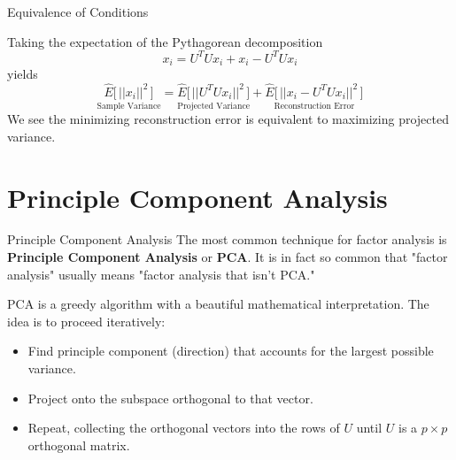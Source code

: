 \documentclass[10pt, table, dvipsnames,xcdraw,handout]{beamer}
\def\layersep{2.5cm}
\begin{document}
\begin{frame}[fragile]{Equivalence of Conditions}
\begin{minipage}[t][0.4\textheight][t]{\textwidth}\centering
{}
  \end{minipage}
  \vfill
\begin{minipage}[t][0.4\textheight][t]{\textwidth}
Taking the expectation of the Pythagorean decomposition 
$$
x_i = U^TUx_i + x_i - U^TUx_i
$$
yields
$$
\underset{\text{Sample Variance}}{\widehat{E}\big[\,|| x_i ||^2\,\big]} 
= 
\underset{\text{Projected Variance}}{\widehat{E}\big[\,|| U^TUx_i  ||^2\,\big]}
 + 
\underset{\text{Reconstruction Error}}{\widehat{E}\big[\,|| x_i - U^TUx_i ||^2\,\big]}
$$\pause
We see the minimizing reconstruction error is equivalent to maximizing projected variance. 
\end{minipage}
\end{frame}








\section{Principle Component Analysis}


\begin{frame}[fragile]{Principle Component Analysis}
The most common technique for factor analysis is \textbf{Principle Component Analysis} or \textbf{PCA}. It is in fact so common that "factor analysis" usually means "factor analysis that isn't PCA."\pause

PCA is a greedy algorithm with a beautiful mathematical interpretation. The idea is to proceed iteratively:\pause
\begin{itemize}
\item[] Find principle component (direction) that accounts for the largest possible variance.\pause
\item[] Project onto the subspace orthogonal to that vector.\pause
\item[] Repeat, collecting the orthogonal vectors into the rows of $U$ until $U$ is a $p\times p$ orthogonal matrix. 
\end{itemize}
\end{frame}
\end{document}
